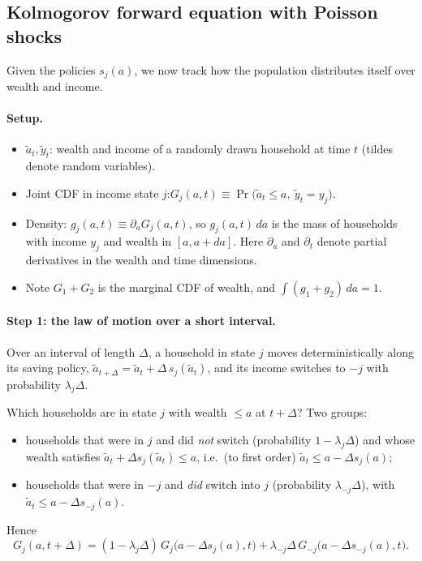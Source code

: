 \subsection{Kolmogorov forward equation with Poisson shocks }

Given the policies $s_j(a)$, we now track how the population distributes itself over wealth and income.

\paragraph{Setup.}
\begin{itemize}
  \item $\tilde a_t,\tilde y_t$: wealth and income of a randomly drawn household at time $t$ (tildes denote random variables).
  \item Joint CDF in income state $j$:\quad $G_j(a,t)\equiv\Pr\big(\tilde a_t\le a,\ \tilde y_t=y_j\big)$.
  \item Density: $g_j(a,t)\equiv\partial_a G_j(a,t)$, so $g_j(a,t)\,da$ is the mass of households with income $y_j$ and wealth in $[a,a+da]$. Here $\partial_a$ and $\partial_t$ denote partial derivatives in the wealth and time dimensions.
  \item Note $G_1+G_2$ is the marginal CDF of wealth, and $\int (g_1+g_2)\,da=1$.
\end{itemize}

\paragraph{Step 1: the law of motion over a short interval.}
Over an interval of length $\Delta$, a household in state $j$ moves deterministically along its saving policy, $\tilde a_{t+\Delta}=\tilde a_t+\Delta\,s_j(\tilde a_t)$, and its income switches to $-j$ with probability $\lambda_j\Delta$.

Which households are in state $j$ with wealth $\le a$ at $t+\Delta$? Two groups:
\begin{itemize}
  \item households that were in $j$ and did \emph{not} switch (probability $1-\lambda_j\Delta$) and whose wealth satisfies $\tilde a_t+\Delta s_j(\tilde a_t)\le a$, i.e.\ (to first order) $\tilde a_t\le a-\Delta s_j(a)$;
  \item households that were in $-j$ and \emph{did} switch into $j$ (probability $\lambda_{-j}\Delta$), with $\tilde a_t\le a-\Delta s_{-j}(a)$.
\end{itemize}
Hence
\begin{equation}\label{eq:kf-discrete}
  G_j(a,t+\Delta) = (1-\lambda_j\Delta)\,G_j\big(a-\Delta s_j(a),t\big) + \lambda_{-j}\Delta\,G_{-j}\big(a-\Delta s_{-j}(a),t\big).
\end{equation}

